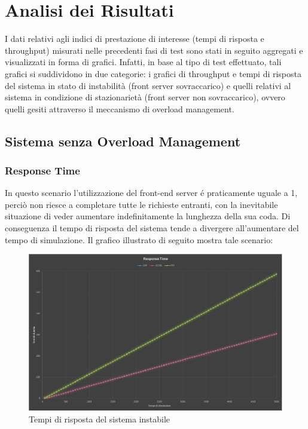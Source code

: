 \chapter{Analisi dei Risultati} 

I dati relativi agli indici di prestazione di interesse (tempi di risposta e throughput) misurati 
nelle precedenti fasi di test sono stati in seguito aggregati e visualizzati in forma di grafici. 
Infatti, in base al tipo di test effettuato, tali grafici si suddividono in due categorie: i grafici di 
throughput e tempi di risposta del sistema in stato di instabilit\`a (front server sovraccarico) e 
quelli relativi al sistema in condizione di stazionariet\`a (front server non sovraccarico), ovvero quelli gesiti
attraverso il meccanismo di overload management.

\section{Sistema senza Overload Management}

\subsection{Response Time}

In questo scenario l’utilizzazione del front-end server \'e praticamente uguale a 1, perci\`o 
non riesce a completare tutte le richieste entranti, con la inevitabile 
situazione di veder aumentare indefinitamente la lunghezza della sua coda. Di 
conseguenza il tempo di risposta del sistema tende a divergere all’aumentare del tempo di 
simulazione. Il grafico illustrato di seguito mostra tale scenario:

\begin{figure}[H]
 \centering
 \includegraphics[scale=0.45]{img/responseTime.png}
 \caption[Tempi di risposta del sistema instabile]{Tempi di risposta del sistema instabile}
 \label{fig:Tempi di risposta del sistema instabile}
\end{figure}

